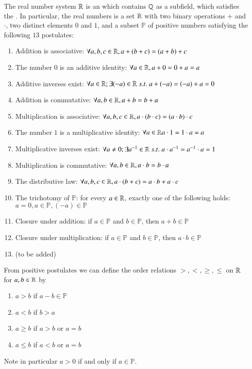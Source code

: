 \begin{defn}
    The real number system $\mathbb R$ is an  which contains $\mathbb Q$ as a subfield, which satisfies the . In particular, the real numbers is a set $\mathbb R$ with two binary operations $+$ and $\cdot$, two distinct elements $0$ and $1$, and a subset $\mathbb{P}$ of positive numbers satisfying the following $13$ postulates:
    \begin{enumerate}
        \item Addition is associative: $\forall a,b,c \in \mathbb R, a+(b+c) = (a+b)+c$
        \item The number $0$ is an additive identity: $\forall a \in \mathbb R, a+0 = 0+a = a$
        \item Additive inverses exist: $\forall a \in \mathbb R;\exists (-a) \in \mathbb R\;s.t.\;a+(-a) = (-a)+a=0$
        \item Addition is commutative: $\forall a,b \in \mathbb R, a+b = b+a$
        \item Multiplication is associative: $\forall a,b,c \in \mathbb R, a\cdot (b\cdot c) = (a \cdot b) \cdot c$
        \item The number $1$ is a multiplicative identity: $\forall a\in \mathbb R a\cdot 1 = 1\cdot a = a$
        \item Multiplicative inverses exist: $\forall a \neq 0;\exists a^{-1} \in \mathbb R\;s.t.\;a\cdot a^{-1} = a^{-1} \cdot a = 1$
        \item Multiplication is commutative: $\forall a,b \in \mathbb R, a\cdot b = b \cdot a$
        \item The distributive law: $\forall a,b,c \in \mathbb R, a\cdot (b+c) = a\cdot b + a \cdot c$
        \item The trichotomy of $\mathbb{P}$: for every $a \in \mathbb R$, exactly one of the following holds: $a = 0, a \in \mathbb{P}, (-a) \in \mathbb{P}$
        \item Closure under addition: if $a \in \mathbb{P}$ and $b \in \mathbb{P}$, then $a+b \in \mathbb{P}$
        \item Closure under multiplication: if $a \in \mathbb{P}$ and $b \in \mathbb{P}$, then $a\cdot b \in \mathbb{P}$
        \item (to be added)
    \end{enumerate}
    From positive postulates we can define the order relations $>, <, \geq, \leq$ on $\mathbb R$ for $a,b \in \mathbb R$ by \begin{enumerate}
        \item $a > b$ if $a-b \in \mathbb{P}$
        \item $a < b$ if $b > a$ 
        \item $a \geq b$ if $a > b$ or $a = b$
        \item $a \leq b$ if $a < b$ or $a = b$
    \end{enumerate}
    Note in particular $a > 0$ if and only if $a \in \mathbb{P}$.
\end{defn}


